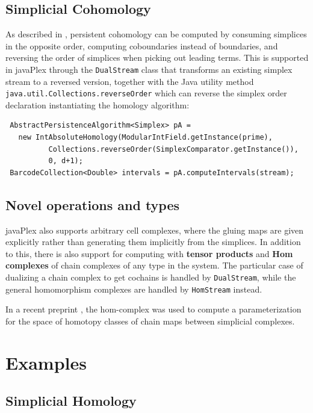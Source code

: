 \documentclass[runningheads,a4paper]{llncs}
\begin{document}
\subsection{Simplicial Cohomology}
\label{sec:simpl-cohom-1}

As described in \cite{Dualities}, persistent cohomology can be
computed by consuming simplices in the opposite order, computing
coboundaries instead of boundaries, and reversing the order of
simplices when picking out leading terms. This is supported in
javaPlex through the \texttt{DualStream} class that transforms an
existing simplex stream to a reversed version, together with the Java
utility method
\texttt{java.util.Collections.reverseOrder} which can reverse the
simplex order declaration instantiating the homology algorithm:

\begin{verbatim}
 AbstractPersistenceAlgorithm<Simplex> pA = 
   new IntAbsoluteHomology(ModularIntField.getInstance(prime), 
          Collections.reverseOrder(SimplexComparator.getInstance()), 
          0, d+1);
 BarcodeCollection<Double> intervals = pA.computeIntervals(stream);
\end{verbatim}

\subsection{Novel operations and types}
\label{sec:novel-oper-types}

javaPlex also supports arbitrary cell complexes, where the gluing maps
are given explicitly rather than generating them implicitly from the
simplices. In addition to this, there is also support for computing
with \textbf{tensor products} and \textbf{Hom complexes} of chain
complexes of any type in the system. The particular case of dualizing
a chain complex to get cochains is handled by \texttt{DualStream},
while the general homomorphism complexes are handled by
\texttt{HomStream} instead.

In a recent preprint \cite{hom}, the hom-complex was used to compute a parameterization for the space of homotopy classes of chain maps between simplicial complexes.


\section{Examples}

\subsection{Simplicial Homology}
\end{document}

